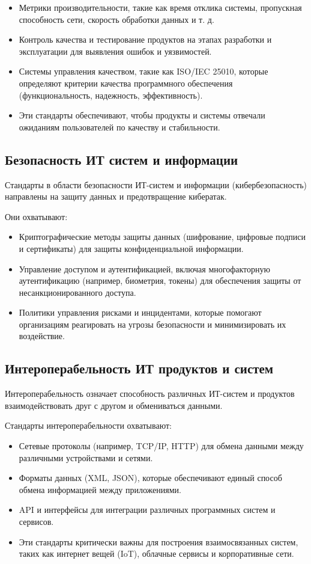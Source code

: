 \begin{itemize}
	\item Метрики производительности, такие как время отклика системы,
		пропускная способность сети, скорость обработки данных и т. д.
	\item Контроль качества и тестирование продуктов на этапах разработки
		и эксплуатации для выявления ошибок и уязвимостей.
	\item Системы управления качеством, такие как ISO/IEC 25010,
		которые определяют критерии качества программного обеспечения
		(функциональность, надежность, эффективность).
	\item Эти стандарты обеспечивают, чтобы продукты
		и системы отвечали ожиданиям пользователей по качеству и стабильности.
\end{itemize}

\subsection{Безопасность ИТ систем и информации}

Стандарты в области безопасности ИТ-систем и информации (кибербезопасность)
направлены на защиту данных и предотвращение кибератак.

Они охватывают:

\begin{itemize}
	\item Криптографические методы защиты данных
		(шифрование, цифровые подписи и сертификаты)
		для защиты конфиденциальной информации.
	\item Управление доступом и аутентификацией,
		включая многофакторную аутентификацию (например, биометрия, токены)
		для обеспечения защиты от несанкционированного доступа.
	\item Политики управления рисками и инцидентами,
		которые помогают организациям реагировать на угрозы безопасности
		и минимизировать их воздействие.
\end{itemize}

\subsection{Интероперабельность ИТ продуктов и систем}

Интероперабельность означает способность различных ИТ-систем
и продуктов взаимодействовать друг с другом и обмениваться данными.

Стандарты интероперабельности охватывают:

\begin{itemize}
	\item Сетевые протоколы (например, TCP/IP, HTTP)
		для обмена данными между различными устройствами и сетями.
	\item Форматы данных (XML, JSON),
		которые обеспечивают единый способ обмена информацией
		между приложениями.
	\item API и интерфейсы для интеграции различных программных систем
		и сервисов.
	\item Эти стандарты критически важны для построения взаимосвязанных систем,
		таких как интернет вещей (IoT), облачные сервисы и корпоративные сети.
\end{itemize}

